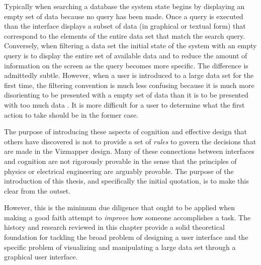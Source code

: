 Typically when searching a database the system state begins by displaying an empty set of data because no query has been made. Once a query is executed than the interface displays a subset of data (in graphical or textual form) that correspond to the elements of the entire data set that match the search query. Conversely, when filtering a data set the initial state of the system with an empty query is to display the entire set of available data and to reduce the amount of information on the screen as the query becomes more specific. The difference is admittedly subtle. However, when a user is introduced to a large data set for the first time, the filtering convention is much less confusing because it is much more disorienting to be presented with a empty set of data than it is to be presented with too much data \cite{seeking1994}. It is more difficult for a user to determine what the first action to take should be in the former case.

The purpose of introducing these aspects of cognition and effective design that others have discovered is not to provide a set of \emph{rules} to govern the decisions that are made in the Vizmapper design. Many of these connections between interfaces and cognition are not rigorously provable in the sense that the principles of physics or electrical engineering are arguably provable. The purpose of the introduction of this thesis, and specifically the initial quotation, is to make this clear from the outset. 

However, this is the minimum due diligence that ought to be applied when making a good faith attempt to \emph{improve} how someone accomplishes a task. The history and research reviewed in this chapter provide a solid theoretical foundation for tackling the broad problem of designing a user interface and the specific problem of visualizing and manipulating a large data set through a graphical user interface. 
